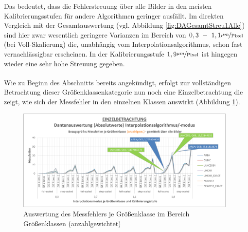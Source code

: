 \documentclass[
fontsize=10pt, 
listof = totoc,
parskip = half	
]{report}
\begin{document}
\noindent Das bedeutet, dass die Fehlerstreuung über alle Bilder in den meisten Kalibrierungsstufen für andere Algorithmen geringer ausfällt. Im direkten Vergleich mit der Gesamtauswertung (vgl. Abbildung \ref{fig:DAGesamtStreu1Alle}) sind hier zwar wesentlich geringere Varianzen im Bereich von $0,3~-~1,1\nicefrac{\mu m}{\text{Pixel}}$ (bei Voll-Skalierung) die, unabhängig vom Interpolationsalgorithmus, schon fast vernachlässigbar erscheinen. In der Kalibrierungsstufe $1,9\nicefrac{\mu m}{\text{Pixel}}$ ist hingegen wieder eine sehr hohe Streuung gegeben.
\\\\
\noindent Wie zu Beginn des Abschnitts bereits angekündigt, erfolgt zur vollständigen Betrachtung dieser Größenklassenkategorie nun noch eine Einzelbetrachtung die zeigt, wie sich der Messfehler in den einzelnen Klassen auswirkt (Abbildung \ref{fig:DAEinzelAbsolutGKanzahl}).

\begin{figure}[H]
	\centering
	\includegraphics[width=11cm, height=\textheight, keepaspectratio]{pics/DA_Einzel_Absolut_GKanzahl}
	\caption{Auswertung des Messfehlers je Größenklasse im Bereich Größenklassen (anzahlgewichtet)}
	\label{fig:DAEinzelAbsolutGKanzahl}
\end{figure}
\end{document}
